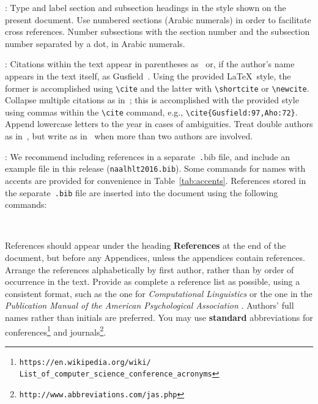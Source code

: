\documentclass[11pt,letterpaper]{article}
\newcommand\BibTeX{B{\sc ib}\TeX}
\begin{document}
: Type and label section and subsection headings in
the style shown on the present document.  Use numbered sections (Arabic
numerals) in order to facilitate cross references. Number subsections
with the section number and the subsection number separated by a dot,
in Arabic numerals. 

: Citations within the text appear in parentheses
as~\cite{Gusfield:97} or, if the author's name appears in the text itself,
as Gusfield~.  Using the provided \LaTeX\ style, the
former is accomplished using {\small\verb|\cite|} and the latter with
{\small\verb|\shortcite|} or {\small\verb|\newcite|}.  Collapse multiple
citations as in~\cite{Gusfield:97,Aho:72}; this is accomplished with the
provided style using commas within the {\small\verb|\cite|} command, e.g.,
{\small\verb|\cite{Gusfield:97,Aho:72}|}. Append lowercase letters to the
year in cases of ambiguities. Treat double authors as in~\cite{Aho:72}, but
write as in~\cite{Chandra:81} when more than two authors are involved.  

:  We recommend
including references in a separate~{\small\texttt .bib} file, and include
an example file in this release ({\small\tt naalhlt2016.bib}). Some commands
for names with accents are provided for convenience in
Table~\ref{tab:accents}. References stored in the separate~{\small\tt .bib}
file are inserted into the document using the following commands:

\small
\begin{verbatim}


\end{verbatim}
\normalsize 

References should appear under the heading {\bf References} at the end of
the document, but before any Appendices, unless the appendices contain
references. Arrange the references alphabetically by first author, rather
than by order of occurrence in the text.
Provide as complete a reference list as possible, using a consistent format,
such as the one for {\em Computational Linguistics\/} or the one in the 
{\em Publication Manual of the American Psychological Association\/}
\cite{APA:83}. Authors' full names rather than initials are preferred. You
may use {\bf standard} abbreviations for conferences\footnote{\scriptsize {\tt https://en.wikipedia.org/wiki/ \\ \-\hspace{.75cm} List\_of\_computer\_science\_conference\_acronyms}}
and journals\footnote{\tt http://www.abbreviations.com/jas.php}.
\end{document}
